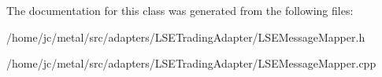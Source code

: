 The documentation for this class was generated from the following files\+:\begin{DoxyCompactItemize}
\item 
/home/jc/metal/src/adapters/\+L\+S\+E\+Trading\+Adapter/L\+S\+E\+Message\+Mapper.\+h\item 
/home/jc/metal/src/adapters/\+L\+S\+E\+Trading\+Adapter/L\+S\+E\+Message\+Mapper.\+cpp\end{DoxyCompactItemize}
